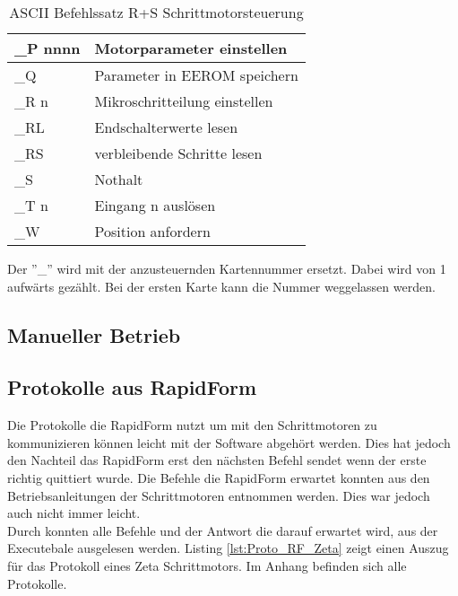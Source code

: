 \begin{table}[htb]
\begin{tabular}{|l|l|}
\rule[-1ex]{0pt}{2.5ex} \_P nnnn 	& Motorparameter einstellen                    \\ \hline 
\rule[-1ex]{0pt}{2.5ex} \_Q 		& Parameter in EEROM speichern                 \\ \hline 
\rule[-1ex]{0pt}{2.5ex} \_R n 		& Mikroschritteilung einstellen                \\ \hline 
\rule[-1ex]{0pt}{2.5ex} \_RL 		& Endschalterwerte lesen                       \\ \hline 
\rule[-1ex]{0pt}{2.5ex} \_RS  		& verbleibende Schritte lesen                  \\ \hline 
\rule[-1ex]{0pt}{2.5ex} \_S   		& Nothalt                                      \\ \hline 
\rule[-1ex]{0pt}{2.5ex} \_T n 		& Eingang n auslösen                           \\ \hline 
\rule[-1ex]{0pt}{2.5ex} \_W   		& Position anfordern                           \\ \hline 
\end{tabular} 
\caption{ASCII Befehlssatz R+S Schrittmotorsteuerung}\cite{rs:ug_stepper}
Der ''\_''  wird mit der anzusteuernden Kartennummer ersetzt. Dabei wird von 1 aufwärts gezählt. Bei der ersten Karte kann die Nummer weggelassen werden.
\label{tbl:ASCII_RS}
\end{table}
\subsection{Manueller Betrieb}
\subsection{Protokolle aus RapidForm}
Die Protokolle die RapidForm nutzt um mit den Schrittmotoren zu kommunizieren können leicht mit der Software  abgehört werden. Dies hat jedoch den Nachteil das RapidForm erst den nächsten Befehl sendet wenn der erste richtig quittiert wurde. Die Befehle die RapidForm erwartet konnten aus den Betriebsanleitungen der Schrittmotoren entnommen werden. Dies war jedoch auch nicht immer leicht.\\
Durch  konnten alle Befehle und der Antwort die darauf erwartet wird, aus der Executebale ausgelesen werden. Listing \ref{lst:Proto_RF_Zeta} zeigt einen Auszug für das Protokoll eines Zeta Schrittmotors. Im Anhang befinden sich alle Protokolle.
\lstset{language=C, basicstyle=\footnotesize, showstringspaces=false, tabsize=8}


